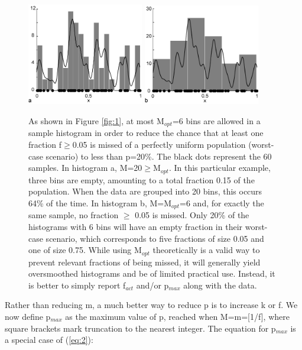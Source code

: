 \documentclass[12]{article}
\begin{document}
\begin{figure}[here]
  \centering
  \includegraphics[width=2in]{fig2a.jpg}
  \includegraphics[width=2in]{fig2b.jpg}
  \caption{As shown in Figure \ref{fig:1}, at most M$_{opt}$=6 bins are allowed
  in a  sample histogram in order  to reduce the chance  that at least
  one fraction f$\geq$0.05 is missed of a perfectly uniform population
  (worst-case scenario) to less than p=20\%.  The black dots represent
  the  60  samples.  In  histogram  a,  M=20$\geq$M$_{opt}$.  In  this
  particular  example, three  bins  are empty,  amounting  to a  total
  fraction 0.15 of the population.   When the data are grouped into 20
  bins, this occurs  64\% of the time.  In  histogram b, M=M$_{opt}$=6
  and, for exactly the same sample, no fraction $\geq$ 0.05 is missed.
  Only 20\% of the histograms with  6 bins will have an empty fraction
  in their worst-case scenario, which corresponds to five fractions of
  size 0.05 and one of  size 0.75. While using M$_{opt}$ theoretically
  is a  valid way  to prevent relevant  fractions of being  missed, it
  will  generally  yield oversmoothed  histograms  and  be of  limited
  practical  use.  Instead, it  is better  to simply  report f$_{act}$
  and/or p$_{max}$ along with the data.}
  \label{fig:2}
\end{figure}

Rather than reducing m, a much better way to reduce p is to increase k
or f.  We now define p$_{max}$ as the maximum value of p, reached when
M=m=[1/f],  where  square  brackets  mark truncation  to  the  nearest
integer.    The  equation  for   p$_{max}$  is   a  special   case  of
(\ref{eq:2}):
\end{document}
